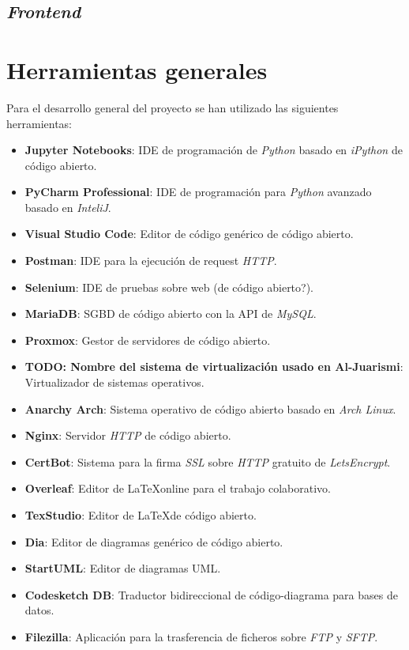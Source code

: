 \subsection{\textit{Frontend}}

\section{Herramientas generales}

Para el desarrollo general del proyecto se han utilizado las siguientes herramientas:
\begin{itemize}
	\item \textbf{Jupyter Notebooks}: IDE de programación de \textit{Python} basado en \textit{iPython} de código abierto.
	\item \textbf{PyCharm Professional}: IDE de programación para \textit{Python} avanzado basado en \textit{InteliJ}.
	\item \textbf{Visual Studio Code}: Editor de código genérico de código abierto.
	\item \textbf{Postman}: IDE para la ejecución de request \textit{HTTP}.
	\item \textbf{Selenium}: IDE de pruebas sobre web (de código abierto?).
	\item \textbf{MariaDB}: SGBD de código abierto con la API de \textit{MySQL}.
	\item \textbf{Proxmox}: Gestor de servidores de código abierto.
	\item \textbf{TODO: Nombre del sistema de virtualización usado en Al-Juarismi}: Virtualizador de sistemas operativos.
	\item \textbf{Anarchy Arch}: Sistema operativo de código abierto basado en \textit{Arch Linux}.
	\item \textbf{Nginx}: Servidor \textit{HTTP} de código abierto.
	\item \textbf{CertBot}: Sistema para la firma \textit{SSL} sobre \textit{HTTP} gratuito de \textit{LetsEncrypt}.
	\item \textbf{Overleaf}: Editor de \LaTeX  online para el trabajo colaborativo.
	\item \textbf{TexStudio}: Editor de \LaTeX  de código abierto.
	\item \textbf{Dia}: Editor de diagramas genérico de código abierto.
	\item \textbf{StartUML}: Editor de diagramas UML.
	\item \textbf{Codesketch DB}: Traductor bidireccional de código-diagrama para bases de datos.
	\item \textbf{Filezilla}: Aplicación para la trasferencia de ficheros sobre \textit{FTP} y \textit{SFTP}.
\end{itemize}
